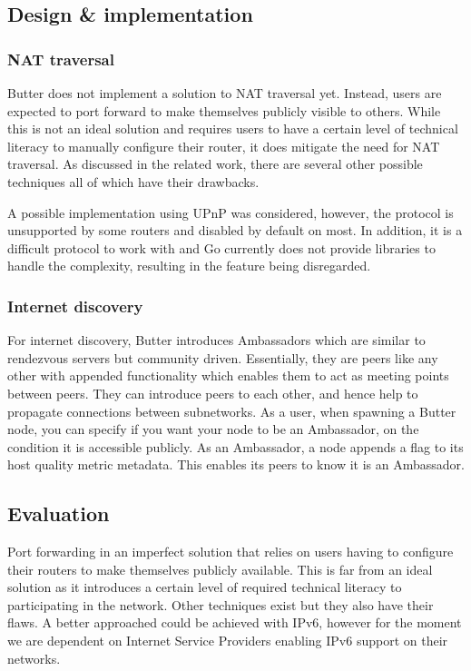 \subsection{Design \& implementation}

\subsubsection{NAT traversal}

Butter does not implement a solution to NAT traversal yet. Instead, users are expected to port forward to make themselves publicly visible to others. While this is not an ideal solution and requires users to have a certain level of technical literacy to manually configure their router, it does mitigate the need for NAT traversal. As discussed in the related work, there are several other possible techniques all of which have their drawbacks.

A possible implementation using UPnP was considered, however, the protocol is unsupported by some routers and disabled by default on most. In addition, it is a difficult protocol to work with and Go currently does not provide libraries to handle the complexity, resulting in the feature being disregarded.

\subsubsection{Internet discovery}

For internet discovery, Butter introduces Ambassadors which are similar to rendezvous servers but community driven. Essentially, they are peers like any other with appended functionality which enables them to act as meeting points between peers. They can introduce peers to each other, and hence help to propagate connections between subnetworks. As a user, when spawning a Butter node, you can specify if you want your node to be an Ambassador, on the condition it is accessible publicly. As an Ambassador, a node appends a flag to its host quality metric metadata. This enables its peers to know it is an Ambassador.


\subsection{Evaluation}

Port forwarding in an imperfect solution that relies on users having to configure their routers to make themselves publicly available. This is far from an ideal solution as it introduces a certain level of required technical literacy to participating in the network. Other techniques exist but they also have their flaws. A better approached could be achieved with IPv6, however for the moment we are dependent on Internet Service Providers enabling IPv6 support on their networks.

